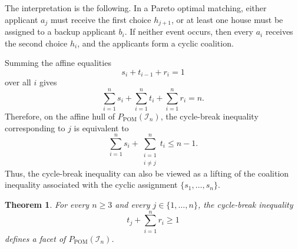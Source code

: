 \documentclass[12pt]{report}
\newtheorem{ttheorem}[base]{Theorem}
\numberwithin{algorithm}{chapter}
\begin{document}
	The interpretation is the following. In a Pareto optimal matching, either applicant $a_j$ must receive the first choice $h_{j+1}$, or at least one house must be assigned to a backup applicant $b_i$. If neither event occurs, then every $a_i$ receives the second choice $h_i$, and the applicants form a cyclic coalition.
	
	Summing the affine equalities
	\[
	s_i+t_{i-1}+r_i=1
	\]
	over all $i$ gives
	\begin{equation}\label{eq:cyclic-affine-sum}
		\sum_{i=1}^{n}s_i
		+
		\sum_{i=1}^{n}t_i
		+
		\sum_{i=1}^{n}r_i
		=n.
	\end{equation}
	Therefore, on the affine hull of $P_{\mathrm{POM}}(\mathcal{I}_n)$, the cycle-break inequality corresponding to $j$ is equivalent to
	\begin{equation}\label{eq:equivalent-cycle-break-inequality}
		\sum_{i=1}^{n}s_i
		+
		\sum_{\substack{i=1\\i\ne j}}^{n}t_i
		\le n-1.
	\end{equation}
	Thus, the cycle-break inequality can also be viewed as a lifting of the coalition inequality associated with the cyclic assignment $\{s_1,\ldots,s_n\}.$
	
	\begin{ttheorem}
		For every $n\ge 3$ and every $j\in\{1,\ldots,n\}$, the cycle-break inequality
		\[
		t_j+\sum_{i=1}^{n}r_i\ge 1
		\]
		defines a facet of $P_{\mathrm{POM}}(\mathcal{I}_n)$.
	\end{ttheorem}
	
\end{document}
